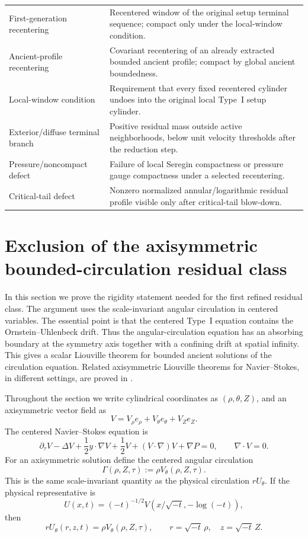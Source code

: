 \documentclass[11pt]{amsart}
\numberwithin{equation}{section}
\theoremstyle{plain}
\theoremstyle{definition}
\theoremstyle{remark}
\begin{document}
\begin{longtable}{@{}L{0.28\textwidth}L{0.66\textwidth}@{}}
First-generation recentering & Recentered window of the original setup terminal
sequence; compact only under the local-window condition.\\
Ancient-profile recentering & Covariant recentering of an already extracted
bounded ancient profile; compact by global ancient boundedness.\\
Local-window condition & Requirement that every fixed recentered cylinder
undoes into the original local Type~I setup cylinder.\\
Exterior/diffuse terminal branch & Positive residual mass outside active
neighborhoods, below unit velocity thresholds after the reduction step.\\
Pressure/noncompact defect & Failure of local Seregin compactness or pressure
gauge compactness under a selected recentering.\\
Critical-tail defect & Nonzero normalized annular/logarithmic residual profile
visible only after critical-tail blow-down.\\
\hline
\end{longtable}

\section{Exclusion of the axisymmetric bounded-circulation residual class}
\label{sec:R1-exclusion}

In this section we prove the rigidity statement needed for the first refined
residual class.  The argument uses the scale-invariant angular circulation in
centered variables.  The essential point is that the centered Type~I equation
contains the Ornstein--Uhlenbeck drift.  Thus the angular-circulation equation
has an absorbing boundary at the symmetry axis together with a confining drift
at spatial infinity.  This gives a scalar Liouville theorem for bounded ancient
solutions of the circulation equation.  Related axisymmetric Liouville theorems
for Navier--Stokes, in different settings, are proved in
\cite{LZZ2017,LRZ2022}.

Throughout the section we write cylindrical coordinates as
\((\rho,\theta,Z)\), and an axisymmetric vector field as
\[
   V=V_\rho e_\rho+V_\theta e_\theta+V_Z e_Z .
\]
The centered Navier--Stokes equation is
\begin{equation}\label{eq:centered-R1}
   \partial_\tau V-\Delta V+\frac12 y\cdot\nabla V+\frac12 V
   +(V\cdot\nabla)V+\nabla P=0,
   \qquad \nabla\cdot V=0 .
\end{equation}
For an axisymmetric solution define the centered angular circulation
\begin{equation}\label{eq:centered-Gamma-def}
   \Gamma(\rho,Z,\tau):=\rho V_\theta(\rho,Z,\tau).
\end{equation}
This is the same scale-invariant quantity as the physical circulation
\(rU_\theta\).  If the physical representative is
\[
   U(x,t)=(-t)^{-1/2}V(x/\sqrt{-t},-\log(-t)),
\]
then
\[
   rU_\theta(r,z,t)=\rho V_\theta(\rho,Z,\tau),
   \qquad r=\sqrt{-t}\,\rho,
   \quad z=\sqrt{-t}\,Z.
\]
\end{document}
